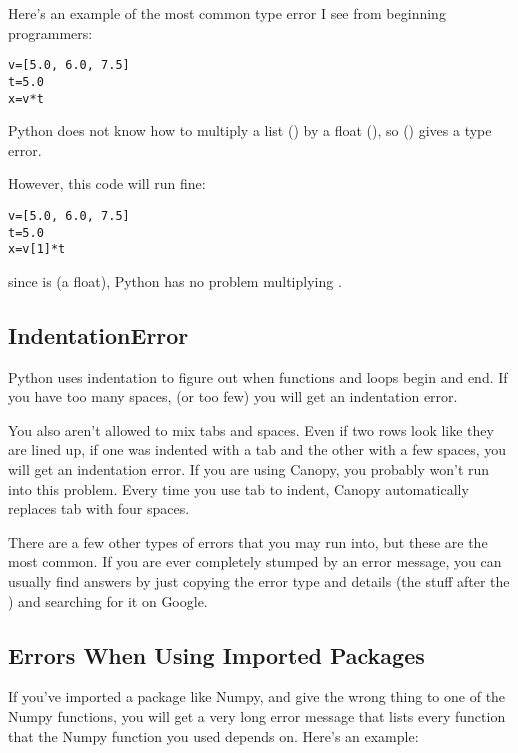 Here's an example of the most common type error I see from beginning programmers:
\begin{Verbatim}
v=[5.0, 6.0, 7.5]
t=5.0
x=v*t
\end{Verbatim}
Python does not know how to multiply a list () by a float (), so () gives a type error.

However, this code will run fine:
\begin{Verbatim}
v=[5.0, 6.0, 7.5]
t=5.0
x=v[1]*t
\end{Verbatim}
since  is  (a float), Python has no problem multiplying .

\subsection*{IndentationError}
Python uses indentation to figure out when functions and loops begin and end.  If you have too many spaces, (or too few) you will get an indentation error.

You also aren't allowed to mix tabs and spaces.  Even if two rows look like they are lined up, if one was indented with a tab and the other with a few spaces, you will get an indentation error.  If you are using Canopy, you probably won't run into this problem. Every time you use tab to indent, Canopy automatically replaces tab with four spaces.

There are a few other types of errors that you may run into, but these are the most common.  If you are ever completely stumped by an error message, you can usually find answers by just copying the error type and details (the stuff after the \code{:}) and searching for it on Google.

\subsection*{Errors When Using Imported Packages}
If you've imported a package like Numpy, and give the wrong thing to one of the Numpy functions, you will get a very long error message that lists every function that the Numpy function you used depends on.  Here's an example:

